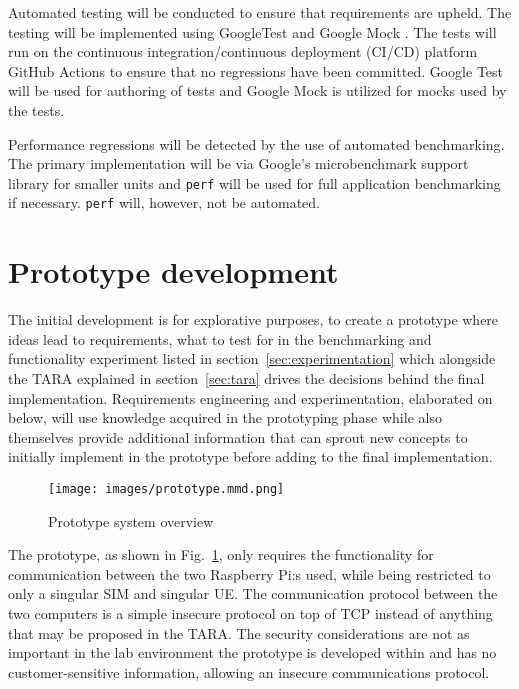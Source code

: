 Automated testing will be conducted to ensure that requirements are
upheld. The testing will be implemented using GoogleTest
\cite{googletest} and Google Mock \cite{googletest}. The tests will
run on the continuous integration/continuous deployment (CI/CD)
platform GitHub Actions \cite{github-actions} to ensure that no
regressions have been committed. Google Test will be used for
authoring of tests and Google Mock is utilized for mocks used by
the tests.

Performance regressions will be detected by the use of automated
benchmarking. The primary implementation will be via Google's
microbenchmark support library \cite{google-benchmark} for smaller
units and \verb|perf| \cite{perf} will be used for full application
benchmarking if necessary. \verb|perf| will, however, not be
automated.

\section{Prototype development}
\label{sec:prototype-development}

The initial development is for explorative purposes, to create a
prototype \cite[62]{sommerville-software-engineering}
\cite[56]{thomas-hunt-pragmatic-programmer} where ideas lead to
requirements, what to test for in the benchmarking and
functionality experiment listed in
section~\ref{sec:experimentation} which alongside the TARA
explained in section~\ref{sec:tara} drives the decisions behind the
final implementation. Requirements engineering and experimentation,
elaborated on below, will use knowledge acquired in the prototyping
phase while also themselves provide additional information that can
sprout new concepts to initially implement in the prototype before
adding to the final implementation.

\begin{figure}[ht]
	\centering
	\texttt{[image: images/prototype.mmd.png]}
	\caption{Prototype system overview}
	\label{fig:prototype-diagram}
\end{figure}

The prototype, as shown in Fig.~\ref{fig:prototype-diagram}, only
requires the functionality for communication between the two
Raspberry Pi:s used, while being restricted to only a singular SIM
and singular UE. The communication protocol between the two
computers is a simple insecure protocol on top of TCP instead of
anything that may be proposed in the TARA. The security
considerations are not as important in the lab environment the
prototype is developed within and has no customer-sensitive
information, allowing an insecure communications protocol.

